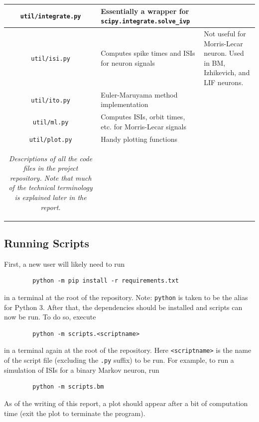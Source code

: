 \documentclass[letterpaper,12pt]{article}
\numberwithin{table}{section}
\numberwithin{figure}{section}
\numberwithin{equation}{section}
\newcommand{\ccaption}[1]{\caption{\textit{#1}}}
\begin{document}
\begin{flushleft}
\begin{center}
\begin{tabularx}{\linewidth}{ | c | Y | X | }
            \texttt{util/integrate.py} & Essentially a wrapper for \texttt{scipy.integrate.solve\_ivp
            } & \\
            \hline
            \texttt{util/isi.py} & Computes spike times and ISIs for neuron signals & Not useful for Morris-Lecar neuron. Used in BM, Izhikevich, and LIF neurons. \\
            \hline
            \texttt{util/ito.py} & Euler-Maruyama method implementation & \\
            \hline
            \texttt{util/ml.py} & Computes ISIs, orbit times, etc. for Morris-Lecar signals & \\
            \hline
            \texttt{util/plot.py} & Handy plotting functions & \\
            \hline

            \captionsetup{width=\linewidth}
            \ccaption{Descriptions of all the code files in the project repository. Note that much of the technical terminology is explained later in the report.}
            \label{tab:code-files}

        \end{tabularx}
    
    \end{center}

    \subsection{Running Scripts}
    First, a new user will likely need to run
    \begin{lstlisting}
        python -m pip install -r requirements.txt
    \end{lstlisting}
    in a terminal at the root of the repository. Note: \texttt{python} is taken to be the alias for Python 3. After that, the dependencies should be installed and scripts can now be run. To do so, execute
    \begin{lstlisting}
        python -m scripts.<scriptname>
    \end{lstlisting}
    in a terminal again at the root of the repository. Here \texttt{<scriptname>} is the name of the script file (excluding the \texttt{.py} suffix) to be run. For example, to run a simulation of ISIs for a binary Markov neuron, run
    \begin{lstlisting}
        python -m scripts.bm
    \end{lstlisting}
    As of the writing of this report, a plot should appear after a bit of computation time (exit the plot to terminate the program).


\end{flushleft}
\end{document}
